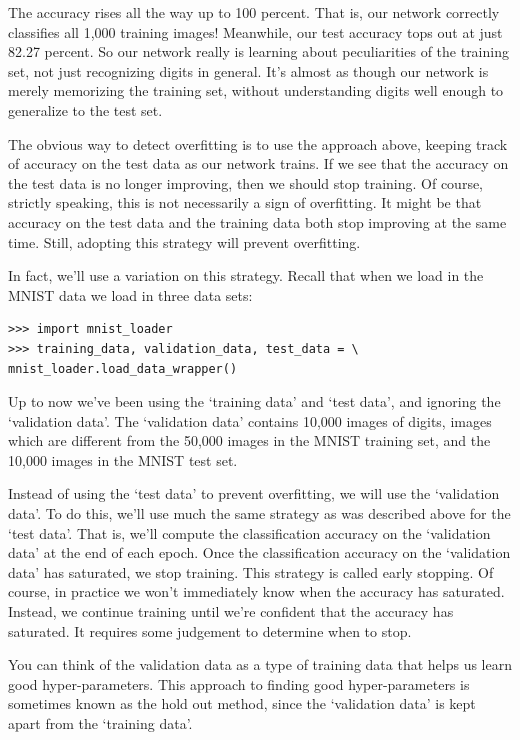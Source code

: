 \documentclass[12 pt]{article}
\begin{document}
The accuracy rises all the way up to 100 percent. That is, our network
correctly classifies all 1,000 training images! Meanwhile, our test
accuracy tops out at just 82.27 percent. So our network really is
learning about peculiarities of the training set, not just recognizing
digits in general. It's almost as though our network is merely
memorizing the training set, without understanding digits well enough to
generalize to the test set.

The obvious way to detect overfitting is to use the approach above,
keeping track of accuracy on the test data as our network trains. If we
see that the accuracy on the test data is no longer improving, then we
should stop training. Of course, strictly speaking, this is not
necessarily a sign of overfitting. It might be that accuracy on the test
data and the training data both stop improving at the same time. Still,
adopting this strategy will prevent overfitting.

In fact, we'll use a variation on this strategy. Recall that when we
load in the MNIST data we load in three data sets:

\begin{verbatim}
>>> import mnist_loader
>>> training_data, validation_data, test_data = \
mnist_loader.load_data_wrapper()
\end{verbatim}

Up to now we've been using the `training data' and `test data', and
ignoring the `validation data'. The `validation data' contains 10,000
images of digits, images which are different from the 50,000 images in
the MNIST training set, and the 10,000 images in the MNIST test set.

Instead of using the `test data' to prevent overfitting, we will use
the `validation data'. To do this, we'll use much the same strategy as
was described above for the `test data'. That is, we'll compute the
classification accuracy on the `validation data' at the end of each
epoch. Once the classification accuracy on the `validation data' has
saturated, we stop training. This strategy is called early stopping. Of
course, in practice we won't immediately know when the accuracy has
saturated. Instead, we continue training until we're confident that the
accuracy has saturated. It requires some judgement to determine when to
stop.

You can think of the validation data as a type of training data that
helps us learn good hyper-parameters. This approach to finding good
hyper-parameters is sometimes known as the hold out method, since the
`validation data' is kept apart from the `training data'.
\end{document}
